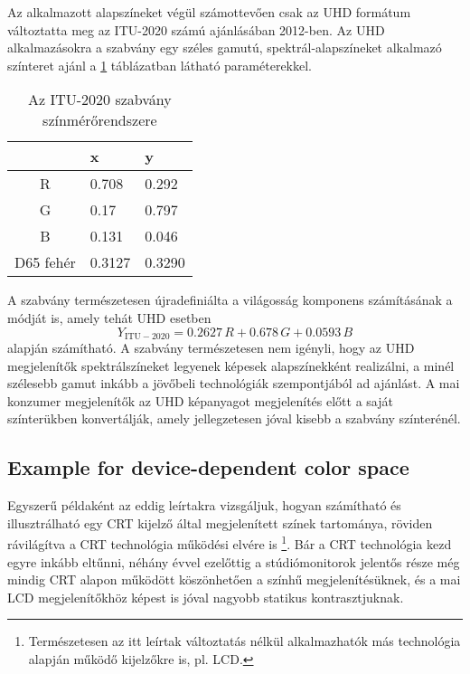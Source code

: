 Az alkalmazott alapszíneket végül számottevően csak az UHD formátum változtatta meg az ITU-2020 számú ajánlásában 2012-ben.
Az UHD alkalmazásokra a szabvány egy széles gamutú, spektrál-alapszíneket alkalmazó színteret ajánl a \ref{tab:UHDTV_colorimetry} táblázatban látható paraméterekkel. 
\begin{table}[h!]
\caption{Az ITU-2020 szabvány színmérőrendszere}
\renewcommand*{\arraystretch}{1}
\label{tab:UHDTV_colorimetry}
\begin{center}
\small\addtolength{\tabcolsep}{15pt}
    \begin{tabular}[h!]{ @{}c | | l | l @{} }%
		&   x  	&    y \\ \hline
    R   &  0.708 &	0.292  \\
    G   &  0.17 &	0.797  \\
    B   & 0.131 &	0.046 \\
    D65 fehér     &  0.3127 & 0.3290 	  \\
    \end{tabular}
\end{center}
\end{table}
A szabvány természetesen újradefiniálta a világosság komponens számításának a módját is, amely tehát UHD esetben
\begin{equation}Y_{\mathrm{ITU}-2020} = 
   0.2627\,R + 0.678 \,G + 0.0593\,B 
\label{Eq:UHD_luminance}
\end{equation}
alapján számítható.
A szabvány természetesen nem igényli, hogy az UHD megjelenítők spektrálszíneket legyenek képesek alapszínekként realizálni, a minél szélesebb gamut inkább a jövőbeli technológiák szempontjából ad ajánlást.
A mai konzumer megjelenítők az UHD képanyagot megjelenítés előtt a saját színterükben konvertálják, amely jellegzetesen jóval kisebb a szabvány színterénél.

\subsection{Example for device-dependent color space}
\label{sec:CRT}

Egyszerű példaként az eddig leírtakra vizsgáljuk, hogyan számítható és illusztrálható egy CRT kijelző által megjelenített színek tartománya, röviden rávilágítva a CRT technológia működési elvére is \footnote{Természetesen az itt leírtak változtatás nélkül alkalmazhatók más technológia alapján működő kijelzőkre is, pl. LCD.}.
Bár a CRT technológia kezd egyre inkább eltűnni, néhány évvel ezelőttig a stúdiómonitorok jelentős része még mindig CRT alapon működött köszönhetően a színhű megjelenítésüknek, és a mai LCD megjelenítőkhöz képest is jóval nagyobb statikus kontrasztjuknak.

